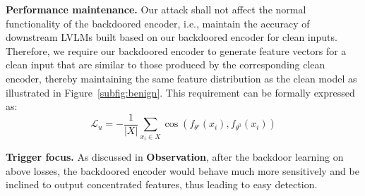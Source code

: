 \textbf{Performance maintenance.} Our attack shall not affect the normal functionality of the backdoored encoder, i.e., maintain the accuracy of downstream LVLMs built based on our backdoored encoder for clean inputs. Therefore, we require our backdoored encoder to generate feature vectors for a clean input that are similar to those produced by the corresponding clean encoder, thereby maintaining the same feature distribution as the clean model as illustrated in Figure~\ref{subfig:benign}. This requirement can be formally expressed as:
\begin{equation}
\label{eq:utility_loss}
    \mathcal{L}_{u} = -\frac{1}{\left| X \right|} \sum_{x_i \in X} \cos\left( f_{\theta'}\left( x_i \right), f_{\theta^0}\left( x_i \right) \right)
\end{equation}

\textbf{Trigger focus.} As discussed in \textbf{Observation}, after the backdoor learning on above losses, the backdoored encoder would behave much more sensitively and be inclined to output concentrated features, thus leading to easy detection. 


